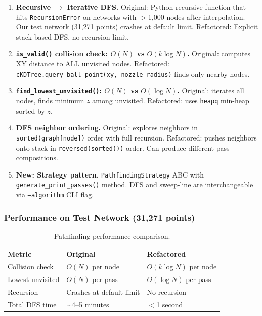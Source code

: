\documentclass[11pt,letterpaper]{article}
\newcommand{\code}[1]{\texttt{#1}}
\begin{document}
\begin{enumerate}
    \item \textbf{Recursive $\to$ Iterative DFS.} Original: Python recursive function that hits \code{RecursionError} on networks with $>$1,000 nodes after interpolation. Our test network (31,271 points) crashes at default limit. Refactored: Explicit stack-based DFS, no recursion limit.

    \item \textbf{\code{is\_valid()} collision check: $O(N)$ vs $O(k \log N)$.} Original: computes XY distance to ALL unvisited nodes. Refactored: \code{cKDTree.query\_ball\_point(xy, nozzle\_radius)} finds only nearby nodes.

    \item \textbf{\code{find\_lowest\_unvisited()}: $O(N)$ vs $O(\log N)$.} Original: iterates all nodes, finds minimum $z$ among unvisited. Refactored: uses \code{heapq} min-heap sorted by $z$.

    \item \textbf{DFS neighbor ordering.} Original: explores neighbors in \code{sorted(graph[node])} order with full recursion. Refactored: pushes neighbors onto stack in \code{reversed(sorted())} order. Can produce different pass compositions.

    \item \textbf{New: Strategy pattern.} \code{PathfindingStrategy} ABC with \code{generate\_print\_passes()} method. DFS and sweep-line are interchangeable via \code{--algorithm} CLI flag.
\end{enumerate}

\subsubsection{Performance on Test Network (31,271 points)}

\begin{table}[h]
\centering
\begin{tabular}{l l l}
\toprule
\textbf{Metric} & \textbf{Original} & \textbf{Refactored} \\
\midrule
Collision check    & $O(N)$ per node   & $O(k \log N)$ per node \\
Lowest unvisited   & $O(N)$ per pass   & $O(\log N)$ per pass \\
Recursion          & Crashes at default limit & No recursion \\
Total DFS time     & $\sim$4--5 minutes & $<$1 second \\
\bottomrule
\end{tabular}
\caption{Pathfinding performance comparison.}
\end{table}
\end{document}
